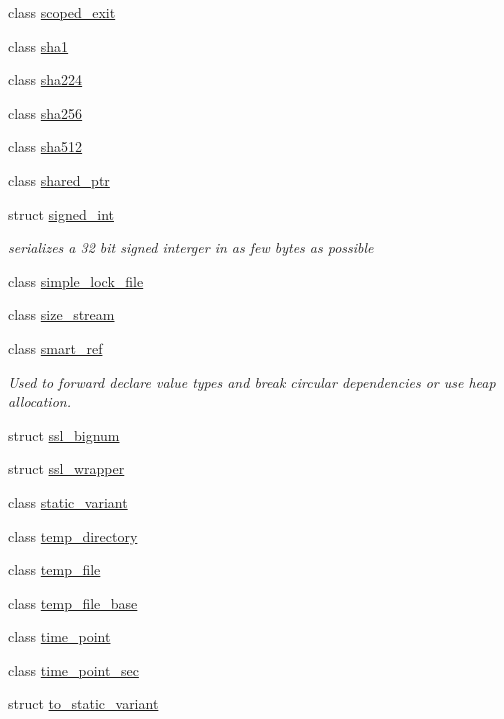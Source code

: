 \begin{DoxyCompactItemize}
\item 
class \mbox{\hyperlink{classfc_1_1scoped__exit}{scoped\+\_\+exit}}
\item 
class \mbox{\hyperlink{classfc_1_1sha1}{sha1}}
\item 
class \mbox{\hyperlink{classfc_1_1sha224}{sha224}}
\item 
class \mbox{\hyperlink{classfc_1_1sha256}{sha256}}
\item 
class \mbox{\hyperlink{classfc_1_1sha512}{sha512}}
\item 
class \mbox{\hyperlink{classfc_1_1shared__ptr}{shared\+\_\+ptr}}
\item 
struct \mbox{\hyperlink{structfc_1_1signed__int}{signed\+\_\+int}}
\begin{DoxyCompactList}\small\item\em serializes a 32 bit signed interger in as few bytes as possible \end{DoxyCompactList}\item 
class \mbox{\hyperlink{classfc_1_1simple__lock__file}{simple\+\_\+lock\+\_\+file}}
\item 
class \mbox{\hyperlink{classfc_1_1size__stream}{size\+\_\+stream}}
\item 
class \mbox{\hyperlink{classfc_1_1smart__ref}{smart\+\_\+ref}}
\begin{DoxyCompactList}\small\item\em Used to forward declare value types and break circular dependencies or use heap allocation. \end{DoxyCompactList}\item 
struct \mbox{\hyperlink{structfc_1_1ssl__bignum}{ssl\+\_\+bignum}}
\item 
struct \mbox{\hyperlink{structfc_1_1ssl__wrapper}{ssl\+\_\+wrapper}}
\item 
class \mbox{\hyperlink{classfc_1_1static__variant}{static\+\_\+variant}}
\item 
class \mbox{\hyperlink{classfc_1_1temp__directory}{temp\+\_\+directory}}
\item 
class \mbox{\hyperlink{classfc_1_1temp__file}{temp\+\_\+file}}
\item 
class \mbox{\hyperlink{classfc_1_1temp__file__base}{temp\+\_\+file\+\_\+base}}
\item 
class \mbox{\hyperlink{classfc_1_1time__point}{time\+\_\+point}}
\item 
class \mbox{\hyperlink{classfc_1_1time__point__sec}{time\+\_\+point\+\_\+sec}}
\item 
struct \mbox{\hyperlink{structfc_1_1to__static__variant}{to\+\_\+static\+\_\+variant}}

\end{DoxyCompactItemize}
